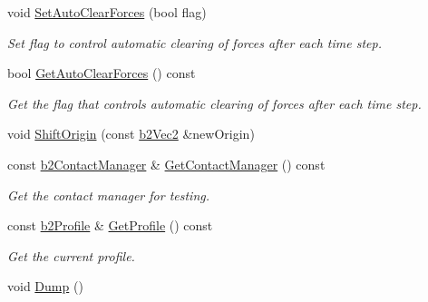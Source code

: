 \begin{DoxyCompactItemize}
\mbox{\label{classb2_world_aa2bced28ddef5bbb00ed5666e5e9f620}} 
void \hyperlink{classb2_world_aa2bced28ddef5bbb00ed5666e5e9f620}{Set\+Auto\+Clear\+Forces} (bool flag)
\begin{DoxyCompactList}\small\item\em Set flag to control automatic clearing of forces after each time step. \end{DoxyCompactList}\item 
\mbox{\label{classb2_world_ae1fa8272edf37a4e2a7be08f6e0a8cc6}} 
bool \hyperlink{classb2_world_ae1fa8272edf37a4e2a7be08f6e0a8cc6}{Get\+Auto\+Clear\+Forces} () const
\begin{DoxyCompactList}\small\item\em Get the flag that controls automatic clearing of forces after each time step. \end{DoxyCompactList}\item 
void \hyperlink{classb2_world_afc33e20e64252c5be115216051408047}{Shift\+Origin} (const \hyperlink{structb2_vec2}{b2\+Vec2} \&new\+Origin)
\item 
\mbox{\label{classb2_world_a3d321151cd851d39bdc8fe52a5be426c}} 
const \hyperlink{classb2_contact_manager}{b2\+Contact\+Manager} \& \hyperlink{classb2_world_a3d321151cd851d39bdc8fe52a5be426c}{Get\+Contact\+Manager} () const
\begin{DoxyCompactList}\small\item\em Get the contact manager for testing. \end{DoxyCompactList}\item 
\mbox{\label{classb2_world_aec4fb0a888e69e0db7f37a4921761711}} 
const \hyperlink{structb2_profile}{b2\+Profile} \& \hyperlink{classb2_world_aec4fb0a888e69e0db7f37a4921761711}{Get\+Profile} () const
\begin{DoxyCompactList}\small\item\em Get the current profile. \end{DoxyCompactList}\item 
void \hyperlink{classb2_world_a73c1fec260d460514edd335d4c235893}{Dump} ()
\end{DoxyCompactItemize}
